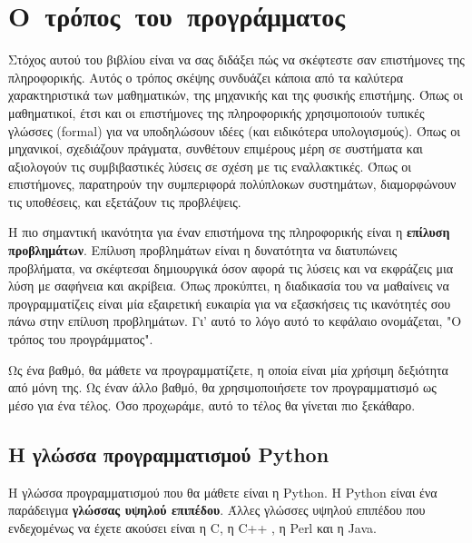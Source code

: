 \documentclass[10pt]{book}
\begin{document}
\normalsize


\begin{latexonly}

\tableofcontents


\end{latexonly}

\mainmatter


\chapter{Ο~τρόπος~του~προγράμματος}

 Στόχος αυτού του βιβλίου είναι να σας διδάξει πώς να σκέφτεστε σαν επιστήμονες
της πληροφορικής.  Αυτός ο τρόπος σκέψης συνδυάζει κάποια από τα καλύτερα χαρακτηριστικά
των μαθηματικών, της μηχανικής και της φυσικής επιστήμης.  Όπως οι μαθηματικοί, έτσι και
οι επιστήμονες της  πληροφορικής χρησιμοποιούν τυπικές γλώσσες (formal) για να υποδηλώσουν
ιδέες (και ειδικότερα υπολογισμούς).  Όπως οι μηχανικοί, σχεδιάζουν πράγματα, συνθέτουν
επιμέρους μέρη σε συστήματα και αξιολογούν τις συμβιβαστικές λύσεις σε σχέση με τις εναλλακτικές.  
Όπως οι επιστήμονες, παρατηρούν την συμπεριφορά πολύπλοκων συστημάτων, διαμορφώνουν τις υποθέσεις,
και εξετάζουν τις προβλέψεις.

Η πιο σημαντική ικανότητα για έναν επιστήμονα της πληροφορικής είναι η 
{\bf επίλυση προβλημάτων}. Επίλυση προβλημάτων είναι η δυνατότητα να διατυπώνεις
προβλήματα, να σκέφτεσαι δημιουργικά όσον αφορά τις λύσεις και να εκφράζεις
μια λύση με σαφήνεια και ακρίβεια.  Όπως προκύπτει, η διαδικασία του να μαθαίνεις
να προγραμματίζεις είναι μία εξαιρετική ευκαιρία για να εξασκήσεις τις ικανότητές σου
πάνω στην επίλυση προβλημάτων.  Γι' αυτό το λόγο αυτό το κεφάλαιο ονομάζεται,
"Ο τρόπος του προγράμματος".

 Ως ένα βαθμό, θα μάθετε να προγραμματίζετε, η οποία είναι μία χρήσιμη δεξιότητα από μόνη της.  
Ως έναν άλλο βαθμό, θα χρησιμοποιήσετε τον προγραμματισμό ως μέσο για ένα τέλος.
Όσο προχωράμε, αυτό το τέλος θα γίνεται πιο ξεκάθαρο.


\section{Η γλώσσα προγραμματισμού Python}

Η γλώσσα προγραμματισμού που θα μάθετε είναι η  Python. Η Python 
είναι ένα παράδειγμα {\bf  γλώσσας υψηλού επιπέδου}. Άλλες γλώσσες
υψηλού επιπέδου που ενδεχομένως να έχετε ακούσει είναι η  C,  η  C++
, η  Perl  και η  Java.
\end{document}

